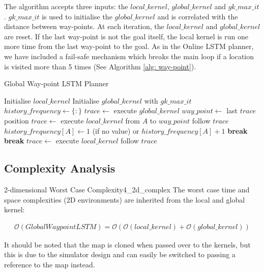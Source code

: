 The algorithm accepts three inputs: the $local\_kernel$, $global\_kernel$ and $gk\_max\_it$. $gk\_max\_it$ is used to initialise the $global\_kernel$ and is correlated with the distance between way-points. At each iteration, the $local\_kernel$ and $global\_kernel$ are reset. If the last way-point is not the goal itself, the local kernel is run one more time from the last way-point to the goal. As in the Online LSTM planner, we have included a fail-safe mechanism which breaks the main loop if a location is visited more than 5 times (See Algorithm \ref{alg: way-point}).

\begin{algorithm}[]
\caption{Global Way-point LSTM Planner}
\label{alg: way-point}
\begin{algorithmic}[1]
    \State
    \State Initialise $local\_kernel$
    \State Initialise $global\_kernel$ with $gk\_max\_it$
    \State $history\_frequency \gets \{\colon\}$
    \State
        \State $trace \gets$ execute $global\_kernel$
        \State $way\_point \gets$ last $trace$ position
        \State $trace \gets$ execute $local\_kernel$ from $A$ to $way\_point$
        \State follow $trace$
        \State
        \State $history\_frequency[A] \gets 1$ (if no value) or $history\_frequency[A] + 1$
        \State
            \State \textbf{break}
        \EndIf
        \State
            \State \textbf{break}
        \EndIf
    \EndWhile
    \State
        \State $trace \gets$ execute $local\_kernel$
        \State follow $trace$
    \EndIf
\EndProcedure
\end{algorithmic}
\end{algorithm}

\subsection{Complexity Analysis}

\begin{Theo}{2-dimensional Worst Case Complexity}{4_2d_complex}
The worst case time and space complexities (2D environments) are inherited from the local and global kernel:

\begin{align*}
    \mathcal{O}(GlobalWaypointLSTM) = \mathcal{O}(\mathcal{O}(local\_kernel) + \mathcal{O}(global\_kernel))
\end{align*}

It should be noted that the map is cloned when passed over to the kernels, but this is due to the simulator design and can easily be switched to passing a reference to the map instead.
\end{Theo}

